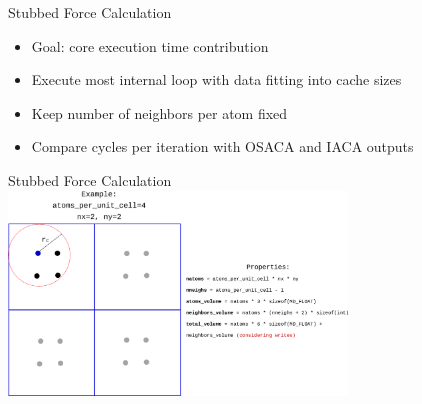 \documentclass[aspectratio=43,t]{beamer}
\begin{document}
  \begin{frame}[fragile]{Stubbed Force Calculation}
    \begin{itemize}
      \item Goal: core execution time contribution
      \item Execute most internal loop with data fitting into cache sizes
      \item Keep number of neighbors per atom fixed
      \item Compare cycles per iteration with OSACA and IACA outputs
    \end{itemize}
  \end{frame}

  \begin{frame}{Stubbed Force Calculation}
  \centering
    \includegraphics[width=9cm]{stubbed_force_mdbench.png}
  \end{frame}
\end{document}
